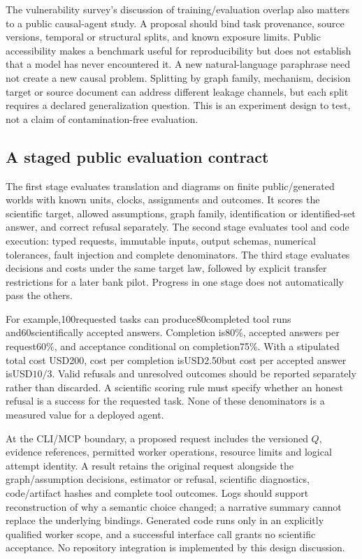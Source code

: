 The vulnerability survey's discussion of training/evaluation overlap also matters to a public causal-agent study. A proposal should bind task provenance, source versions, temporal or structural splits, and known exposure limits. Public accessibility makes a benchmark useful for reproducibility but does not establish that a model has never encountered it. A new natural-language paraphrase need not create a new causal problem. Splitting by graph family, mechanism, decision target or source document can address different leakage channels, but each split requires a declared generalization question. This is an experiment design to test, not a claim of contamination-free evaluation.\citep{exec25_cow_vulnerability,exec25_cow_reference}

\subsection{A staged public evaluation contract}

The first stage evaluates translation and diagrams on finite public/generated worlds with known units, clocks, assignments and outcomes. It scores the scientific target, allowed assumptions, graph family, identification or identified-set answer, and correct refusal separately. The second stage evaluates tool and code execution: typed requests, immutable inputs, output schemas, numerical tolerances, fault injection and complete denominators. The third stage evaluates decisions and costs under the same target law, followed by explicit transfer restrictions for a later bank pilot. Progress in one stage does not automatically pass the others.\citep{exec25_cow_reference}

For example,100requested tasks can produce80completed tool runs and60scientifically accepted answers. Completion is80\%, accepted answers per request60\%, and acceptance conditional on completion75\%. With a stipulated total cost USD200, cost per completion isUSD2.50but cost per accepted answer isUSD$10/3$. Valid refusals and unresolved outcomes should be reported separately rather than discarded. A scientific scoring rule must specify whether an honest refusal is a success for the requested task. None of these denominators is a measured value for a deployed agent.\citep{exec25_cow_reference}

At the CLI/MCP boundary, a proposed request includes the versioned $Q$, evidence references, permitted worker operations, resource limits and logical attempt identity. A result retains the original request alongside the graph/assumption decisions, estimator or refusal, scientific diagnostics, code/artifact hashes and complete tool outcomes. Logs should support reconstruction of why a semantic choice changed; a narrative summary cannot replace the underlying bindings. Generated code runs only in an explicitly qualified worker scope, and a successful interface call grants no scientific acceptance. No repository integration is implemented by this design discussion.\citep{exec25_cow_reference}

